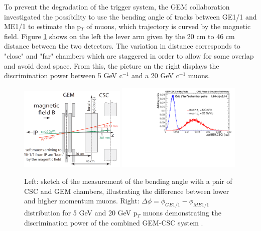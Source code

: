     To prevent the degradation of the trigger system, the GEM collaboration investigated the possibility to use the bending angle of tracks between GE1/1 and ME1/1 to estimate the p$_T$ of muons, which trajectory is curved by the magnetic field. Figure \ref{fig:II-1-csc-bending} shows on the left the lever arm given by the 20 cm to 46 cm distance between the two detectors. The variation in distance corresponds to "close" and "far" chambers which are staggered in order to allow for some overlap and avoid dead space. From this, the picture on the right displays the discrimination power between 5 GeV c$^{-1}$ and a 20 GeV c$^{-1}$ muons. \\

    \begin{figure}[h!]
      \centering
      \includegraphics[width=0.45\textwidth]{img/II-1-gem/gem-csc-bending-1.png}
      \includegraphics[width=0.53\textwidth]{img/II-1-gem/gem-csc-bending-2.pdf}
      \caption{Left: sketch of the measurement of the bending angle with a pair of CSC and GEM chambers, illustrating the difference between lower and higher momentum muons. Right: $ \Delta \phi = \phi_{GE1/1} - \phi_{ME1/1} $ distribution for 5 GeV and 20 GeV p$_T$ muons demonstrating the discrimination power of the combined GEM-CSC system \cite{Colaleo:2021453}.}
      \label{fig:II-1-csc-bending}
    \end{figure}

